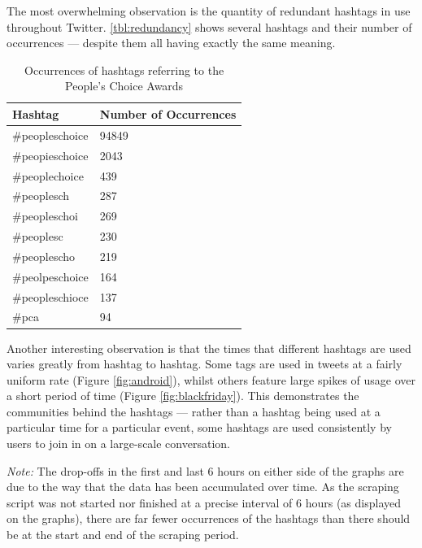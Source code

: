 \documentclass[12pt,a4paper]{article}
\begin{document}
The most overwhelming observation is the quantity of redundant hashtags in use throughout Twitter. \autoref{tbl:redundancy} shows several hashtags and their number of occurrences --- despite them all having exactly the same meaning.

\begin{table}[H]
    \centering
    \begin{tabular}{| l | l |}
        \hline
        \textbf{Hashtag} & \textbf{Number of Occurrences} \\
        \hline \hline
        \#peopleschoice & 94849 \\ \hline
        \#peopieschoice & 2043 \\ \hline
        \#peoplechoice  & 439 \\ \hline
        \#peoplesch     & 287 \\ \hline
        \#peopleschoi   & 269 \\ \hline
        \#peoplesc      & 230 \\ \hline
        \#peoplescho    & 219 \\ \hline
        \#peolpeschoice & 164 \\ \hline
        \#peopleschioce & 137 \\ \hline
        \#pca           & 94 \\ \hline
    \end{tabular}
    \caption{Occurrences of hashtags referring to the People's Choice Awards}
    \label{tbl:redundancy}
\end{table}

Another interesting observation is that the times that different hashtags are used varies greatly from hashtag to hashtag. Some tags are used in tweets at a fairly uniform rate (Figure \autoref{fig:android}), whilst others feature large spikes of usage over a short period of time (Figure \autoref{fig:blackfriday}). This demonstrates the communities behind the hashtags --- rather than a hashtag being used at a particular time for a particular event, some hashtags are used consistently by users to join in on a large-scale conversation.

\emph{Note:} The drop-offs in the first and last 6 hours on either side of the graphs are due to the way that the data has been accumulated over time. As the scraping script was not started nor finished at a precise interval of 6 hours (as displayed on the graphs), there are far fewer occurrences of the hashtags than there should be at the start and end of the scraping period.
\end{document}

